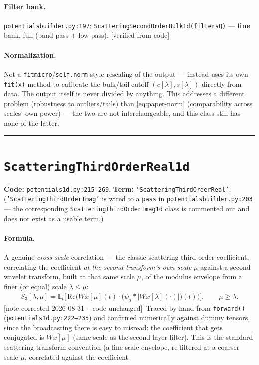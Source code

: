 \documentclass[11pt]{article}
\newcommand{\E}{\mathbb{E}}
\newcommand{\Wx}{W\!x}
\newcommand{\code}[1]{\texttt{#1}}
\renewcommand{\_}{\origunderscore\allowbreak} %
\newcommand{\verified}{\textcolor{blue!50!black}{[verified from code]}}
\newcommand{\notefix}{\textcolor{orange!70!black}{[note corrected 2026-08-31 -- code unchanged]}}
\begin{document}
\paragraph{Filter bank.} \code{potentials\_builder.py:197}: \code{Scattering\_Second\_Order\_Bulk\_1d(filters\_Q)}
— \textbf{fine} bank, full (band-pass + low-pass). \verified

\paragraph{Normalization.} Not a \code{fit\_micro}/\code{self.norm}-style
rescaling of the output — instead uses its own \code{fit(x)} method to calibrate
the bulk/tail cutoff $(c[\lambda], s[\lambda])$ directly from data. The output
itself is never divided by anything. This addresses a different problem
(robustness to outliers/tails) than \eqref{eq:paper-norm} (comparability across
scales' own power) — the two are not interchangeable, and this class still has
none of the latter.

\bigskip
\hrule
\bigskip

\section{\code{Scattering\_Third\_Order\_Real\_1d}}
\textbf{Code:} \code{potentials\_1d.py:215--269}. \quad
\textbf{Term:} \code{'Scattering\_Third\_Order\_Real'}.
(\code{'Scattering\_Third\_Order\_Imag'} is wired to a \code{pass} in
\code{potentials\_builder.py:203} — the corresponding \code{Scattering\_Third\_Order\_Imag\_1d}
class is commented out and does not exist as a usable term.)

\paragraph{Formula.} A genuine \emph{cross-scale} correlation — the classic
scattering third-order coefficient, correlating the coefficient \emph{at the
second-transform's own scale} $\mu$ against a second wavelet transform, built
at that same scale $\mu$, of the modulus envelope from a finer (or equal)
scale $\lambda \le \mu$:
\begin{equation}
  S_3[\lambda,\mu] = \E_t\Big[\,\mathrm{Re}\Big(
     \overline{\Wx[\mu](t)} \cdot \big(\psi_{\mu} * |\Wx[\lambda](\cdot)|\big)(t)
  \Big)\Big], \qquad \mu \ge \lambda.
\end{equation}
\notefix\ Traced by hand from \code{forward()} (\code{potentials\_1d.py:222--235})
and confirmed numerically against dummy tensors, since the broadcasting there
is easy to misread: the coefficient that gets conjugated is
$\overline{\Wx[\mu]}$ (same scale as the second-layer filter). This is the standard scattering-transform convention (a
fine-scale envelope, re-filtered at a coarser scale $\mu$, correlated against
the coefficient. 
\end{document}
